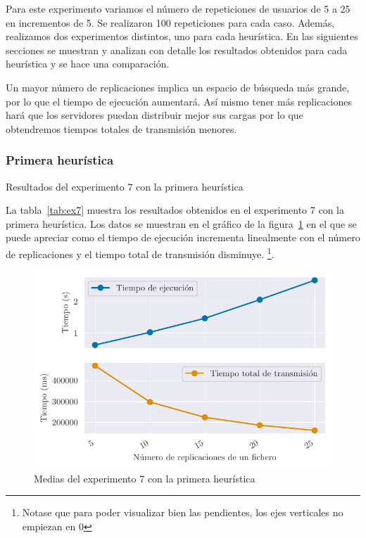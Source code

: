 Para este experimento variamos el número de repeticiones de usuarios de 5 a 25 en incrementos de 5. Se realizaron 100
repeticiones para cada caso. Además, realizamos dos experimentos distintos, uno para cada heurística. En las
siguientes secciones se muestran y analizan con detalle los resultados obtenidos para cada heurística y se hace una
comparación.

\begin{hyp*}
    Un mayor número de replicaciones implica un espacio de búsqueda más grande, por lo que el tiempo de ejecución
    aumentará. Así mismo tener más replicaciones hará que los servidores puedan distribuir mejor sus cargas por
    lo que obtendremos tiempos totales de transmisión menores.
\end{hyp*}

\subsubsection{Primera heurística}
\begin{table}[H]
    \centering
    \caption{Resultados del experimento 7 con la primera heurística}%
    \label{tab:ex7}
    \begin{center}
    
    \end{center}
\end{table}

La tabla~\ref{tab:ex7} muestra los resultados obtenidos en el experimento 7 con la primera heurística. Los
datos se muestran en el gráfico de la figura~\ref{fig:ex7means} en el que se puede apreciar como el tiempo
de ejecución incrementa linealmente con el número de replicaciones y el tiempo total de transmisión disminuye.
\footnote{Notase que para poder visualizar bien las pendientes, los ejes verticales no empiezan en 0}.

\begin{figure}[H]
    \centering
    \includegraphics{include/plots/ex7_means.pdf}
    \caption{Medias del experimento 7 con la primera heurística}%
    \label{fig:ex7means}
\end{figure}

